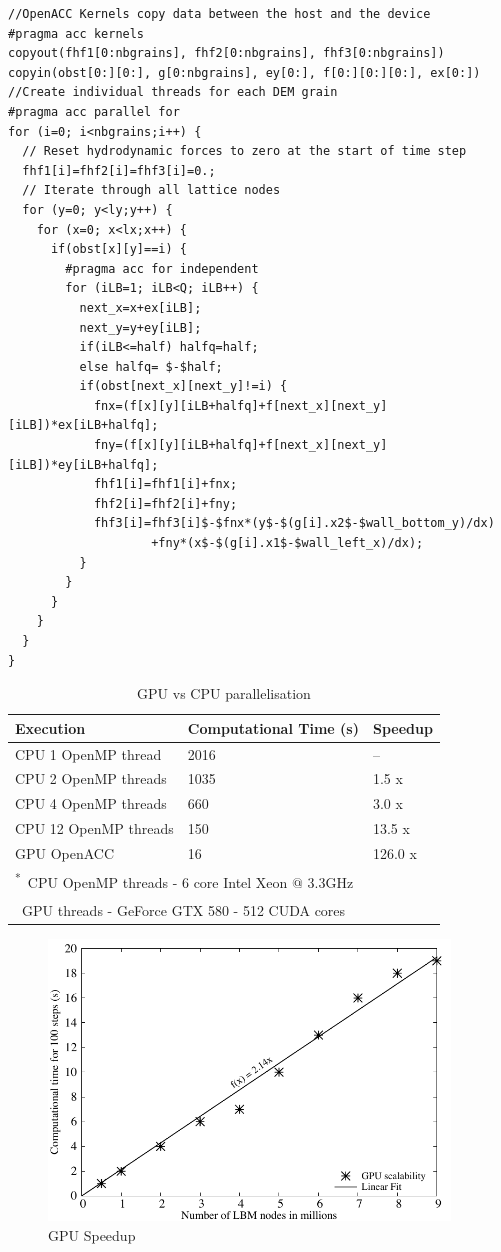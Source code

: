 \begin{lstlisting}[label=lst:GPU,caption= OpenACC GPU implementation of 
hydrodynamic force computation,style=customcpp]
//OpenACC Kernels copy data between the host and the device
#pragma acc kernels 
copyout(fhf1[0:nbgrains], fhf2[0:nbgrains], fhf3[0:nbgrains]) 
copyin(obst[0:][0:], g[0:nbgrains], ey[0:], f[0:][0:][0:], ex[0:])
//Create individual threads for each DEM grain
#pragma acc parallel for
for (i=0; i<nbgrains;i++) {
  // Reset hydrodynamic forces to zero at the start of time step
  fhf1[i]=fhf2[i]=fhf3[i]=0.;
  // Iterate through all lattice nodes
  for (y=0; y<ly;y++) {
    for (x=0; x<lx;x++) {
      if(obst[x][y]==i) {
        #pragma acc for independent
        for (iLB=1; iLB<Q; iLB++) {
          next_x=x+ex[iLB];
          next_y=y+ey[iLB];
          if(iLB<=half) halfq=half;
          else halfq= $-$half;
          if(obst[next_x][next_y]!=i) {
            fnx=(f[x][y][iLB+halfq]+f[next_x][next_y][iLB])*ex[iLB+halfq];
            fny=(f[x][y][iLB+halfq]+f[next_x][next_y][iLB])*ey[iLB+halfq];
            fhf1[i]=fhf1[i]+fnx;
            fhf2[i]=fhf2[i]+fny;
            fhf3[i]=fhf3[i]$-$fnx*(y$-$(g[i].x2$-$wall_bottom_y)/dx) 
                    +fny*(x$-$(g[i].x1$-$wall_left_x)/dx);
          }			
        }
      }
    }
  }
}
\end{lstlisting}


\begin{table}[tbhp]
	\caption{GPU vs CPU parallelisation}
	\label{table:GPU}
	\centering
	\begin{tabular}{l l l}
		\toprule
		Execution & Computational Time (s) &  Speedup \\
		\midrule
		CPU 1 OpenMP thread		& 2016	 & -- \\
		CPU 2 OpenMP threads	& 1035	 & 1.5 x \\
		CPU 4 OpenMP threads	& 660 	 & 3.0 x \\
		CPU 12 OpenMP threads	& 150	 & 13.5 x\\
		GPU OpenACC				& 16	 & 126.0 x \\
		\bottomrule
		\multicolumn{3}{l}{\footnotesize{\textsuperscript{*}~CPU OpenMP threads 
		- 6 core Intel Xeon $\mathrm{@}$ 3.3GHz}} \\
		\multicolumn{3}{l}{\footnotesize{\textsuperscript{\dag}~GPU threads - 
		GeForce GTX 580 - 512 CUDA cores}}
	\end{tabular}
\end{table}



\begin{figure}[tbhp]
	\centering
	\includegraphics[width=0.95\textwidth]{GPU_Speedup}
	\caption{GPU Speedup}
	\label{fig:GPUSpeed}
\end{figure}

